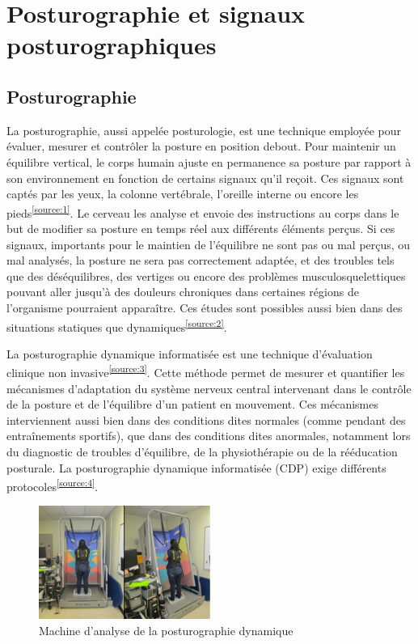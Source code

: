 \section{Posturographie et signaux posturographiques }

\subsection{Posturographie}

La posturographie, aussi appelée posturologie, est une technique employée pour évaluer, mesurer et contrôler la posture en position debout. 
Pour maintenir un équilibre vertical, le corps humain ajuste en permanence sa posture par rapport à son environnement en fonction de certains signaux qu'il reçoit. 
Ces signaux sont captés par les yeux, la colonne vertébrale, l’oreille interne ou encore les pieds\textsuperscript{\ref{source:1}}. 
Le cerveau les analyse et envoie des instructions au corps dans le but de modifier sa posture en temps réel aux différents éléments perçus. 
Si ces signaux, importants pour le maintien de l'équilibre ne sont pas ou mal perçus, ou mal analysés, la posture ne sera pas correctement adaptée, et des troubles tels que des déséquilibres, des vertiges ou encore des problèmes musculosquelettiques pouvant aller jusqu'à des douleurs chroniques dans certaines régions de l’organisme pourraient apparaître.
Ces études sont possibles aussi bien dans des situations statiques que dynamiques\textsuperscript{\ref{source:2}}.



La posturographie dynamique informatisée est une technique d'évaluation clinique non invasive\textsuperscript{\ref{source:3}}. 
Cette méthode permet de mesurer et quantifier les mécanismes d’adaptation du système nerveux central intervenant dans le contrôle de la posture et de l'équilibre d’un patient en mouvement. 
Ces mécanismes interviennent aussi bien dans des conditions dites normales (comme pendant des entraînements sportifs), que dans des conditions dites anormales, notamment lors du diagnostic de troubles d'équilibre, de la physiothérapie ou de la rééducation posturale. 
La posturographie dynamique informatisée (CDP) exige différents protocoles\textsuperscript{\ref{source:4}}.


\begin{figure}[H]
  \centering
  \includegraphics[width=0.5\textwidth]{images/introduction/dynamique.png}
  \caption{Machine d’analyse de la posturographie dynamique }
  \label{fig:posturographie-dynamique}
\end{figure}

